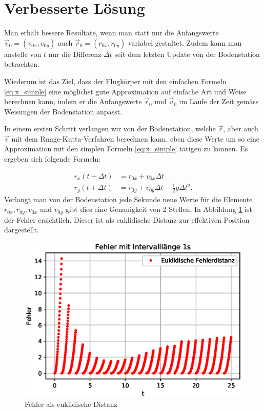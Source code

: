 \section{Verbesserte Lösung
\label{perturbation:section:verbesserte_loesung}}

Man erhält bessere Resultate, wenn man statt nur die Anfangswerte $\vec{v}_0 = (v_{0x}, v_{0y})$ auch $\vec{r}_0 = (r_{0x}, r_{0y})$ variabel gestaltet.
Zudem kann man anstelle von $t$ nur die Differenz $\Delta t$ seit dem letzten Update von der Bodenstation betrachten.

Wiederum ist das Ziel, dass der Flugkörper mit den einfachen Formeln \eqref{eq:x_simple} eine möglichst gute Approximation auf einfache Art und Weise berechnen kann,
indem er die Anfangswerte $\vec{r}_0$ und $\vec{v}_0$ im Laufe der Zeit gemäss Weisungen der Bodenstation anpasst.

In einem ersten Schritt verlangen wir von der Bodenstation, welche $\vec{r}$, aber auch $\vec{v}$ mit dem Runge-Kutta-Verfahren berechnen kann,
eben diese Werte um so eine Approximation mit den simplen Formeln \eqref{eq:x_simple} tätigen zu können.
Es ergeben sich folgende Formeln:

\begin{equation}
\begin{aligned}
r_x(t + \Delta t) &= r_{0x} + v_{0x}\Delta t\\
r_y(t + \Delta t) &= r_{0y} + v_{0y}\Delta t - \frac{1}{2}g\Delta t^2.
\end{aligned}
\end{equation}
Verlangt man von der Bodenstation jede Sekunde neue Werte für die Elemente $r_{0x}, r_{0y}, v_{0x}$ und $v_{0y}$ gibt dies eine Genauigkeit von 2 Stellen.
In Abbildung \ref{error} ist der Fehler ersichtlich.
Dieser ist als euklidische Distanz zur effektiven Position dargestellt.

\begin{figure}
    \centering
    \includegraphics[scale = 0.7]{papers/perturbation/bilder/perturbation_fig3.eps}
    \caption{Fehler als euklidische Distanz}
	\label{error}
\end{figure}